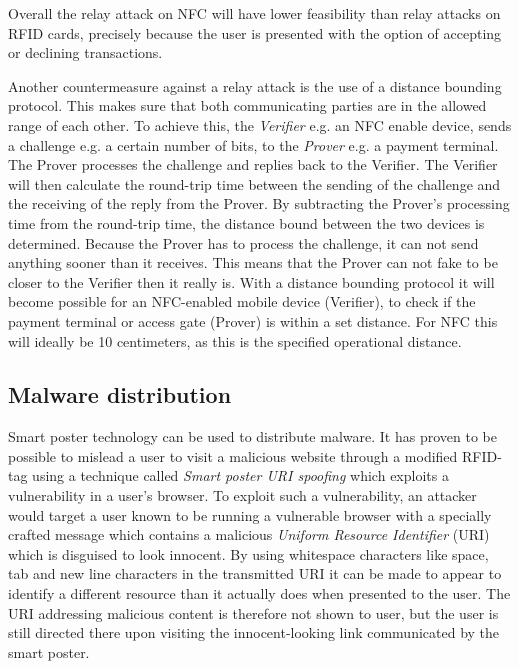 Overall the relay attack on NFC will have lower feasibility than relay attacks on RFID cards, precisely because the user is presented with the option of accepting or declining transactions.

Another countermeasure against a relay attack is the use of a distance bounding protocol. This makes sure that both communicating parties are in the allowed range of each other. To achieve this, the \textit{Verifier} e.g. an NFC enable device, sends a challenge e.g. a certain number of bits, to the \textit{Prover} e.g. a payment terminal. The Prover processes the challenge and replies back to the Verifier. The Verifier will then calculate the round-trip time between the sending of the challenge and the receiving of the reply from the Prover. By subtracting the Prover's processing time from the round-trip time, the distance bound between the two devices is determined. 
Because the Prover has to process the challenge, it can not send anything sooner than it receives. This means that the Prover can not fake to be closer to the Verifier then it really is.
With a distance bounding protocol it will become possible for an NFC-enabled mobile device (Verifier), to check if the payment terminal or access gate (Prover) is within a set distance.
For NFC this will ideally be 10 centimeters, as this is the specified operational distance. \cite{rasmussenrealization,brands1994distance}



\subsection{Malware distribution}
Smart poster technology can be used to distribute malware.
It has proven to be possible to mislead a user to visit a malicious website through a modified RFID-tag using a technique called \textit{Smart poster URI spoofing} which exploits a vulnerability in a user's browser.
To exploit such a vulnerability, an attacker would target a user known to be running a vulnerable browser with a specially crafted message which contains a malicious \textit{Uniform Resource Identifier} (URI) which is disguised to look innocent.
By using whitespace characters like space, tab and new line characters in the transmitted URI it can be made to appear to identify a different resource than it actually does when presented to the user.
The URI addressing malicious content is therefore not shown to user, but the user is still directed there upon visiting the innocent-looking link communicated by the smart poster.
\cite{mulliner2009vulnerability}

